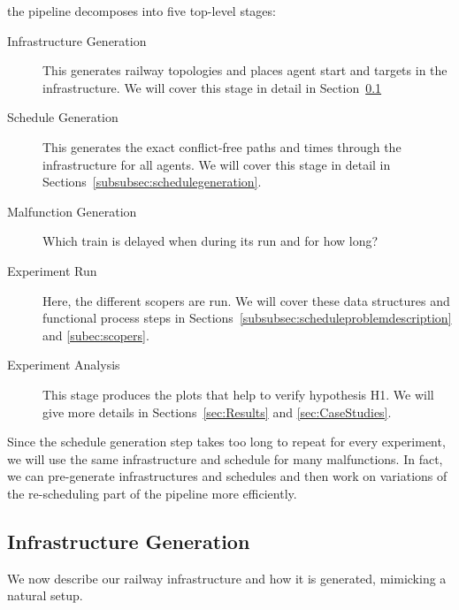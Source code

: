 \documentclass{article}
\begin{document}
%
the pipeline decomposes into five top-level stages:
\begin{description}
\item[Infrastructure Generation] This generates railway topologies and places agent start and targets in the infrastructure. We will cover this stage in detail in Section~\ref{subsubsec:infrastructuregeneration}
\item[Schedule Generation] This generates the exact conflict-free paths and times through the infrastructure for all agents. We will cover this stage in detail in Sections~\ref{subsubsec:schedulegeneration}.
\item[Malfunction Generation] Which train is delayed when during its run and for how long?
\item[Experiment Run] Here, the different scopers are run. We will cover these data structures and functional process steps in Sections~\ref{subsubsec:scheduleproblemdescription} and \ref{subec:scopers}.
\item[Experiment Analysis] This stage produces the plots that help to verify hypothesis H1. We will give more details in Sections~\ref{sec:Results} and \ref{sec:CaseStudies}.
\end{description}
Since the schedule generation step takes too long to repeat for every experiment, we will use the same infrastructure and schedule for many malfunctions. In fact, we can pre-generate infrastructures and schedules and then work on variations of the re-scheduling part of the pipeline more efficiently.



\subsection{Infrastructure Generation}\label{subsubsec:infrastructuregeneration}

We now describe our railway infrastructure and how it is generated, mimicking a natural setup.
\end{document}
